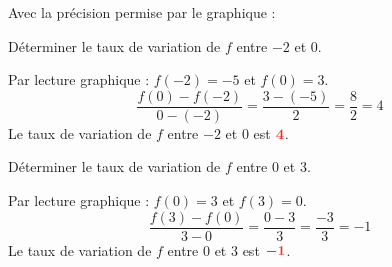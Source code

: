 \documentclass[11pt,a4paper]{article}  %
\begin{document}
	Avec la précision permise par le graphique :
	
	\begin{enumMet}
		\item {} Déterminer le taux de variation de $f$ entre $-2$ et $0$.
		
		\begin{corrBox}
			Par lecture graphique : $f(-2)=-5$ \quad {} et $f(0)=3$. \quad {}
			\[\dfrac{f(0)-f(-2)}{0-(-2)}=\dfrac{3-(-5)}{2}=\dfrac{8}{2}=4\]
			Le taux de variation de $f$ entre $-2$ et $0$ est $\mRouge{4}$. \quad {}
		\end{corrBox}
		
		\item Déterminer le taux de variation de $f$ entre $0$ et $3$.
		
		\begin{corrBox}
			Par lecture graphique : $f(0)=3$ \quad {} et $f(3)=0$. \quad \bareme{0,5}
			\[\dfrac{f(3)-f(0)}{3-0}=\dfrac{0-3}{3}=\dfrac{-3}{3}=-1\]
			Le taux de variation de $f$ entre $0$ et $3$ est $\mRouge{-1}$. \quad \bareme{0,5}
		\end{corrBox}
	\end{enumMet}
	
\end{document}

